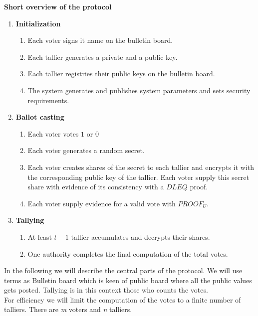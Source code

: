 \noindent
\textbf{Short overview of the protocol}

\noindent
\begin{enumerate}
    \item \textbf{Initialization}
        \begin{enumerate}
        \item Each voter signs it name on the bulletin board.
        \item Each tallier generates a private and a public key.
        \item Each tallier registries their public keys on the bulletin board.
        \item The system generates and publishes system parameters and sets security requirements.
        \end{enumerate}
    \item \textbf{Ballot casting}
    \begin{enumerate}
        \item Each voter votes $1$ or $0$
        \item Each voter generates a random secret.
        \item Each voter creates shares of the secret to each tallier and encrypts it with the corresponding public key of the tallier. Each voter supply this secret share with evidence of its consistency with a $DLEQ$ proof.
        \item Each voter supply evidence for a valid vote with $PROOF_U$.
    \end{enumerate}
    \item \textbf{Tallying}
    \begin{enumerate}
        \item At least $t-1$ tallier accumulates and decrypts their shares.
        \item One authority completes the final computation of the total votes.
    \end{enumerate}
\end{enumerate}


\noindent
In the following we will describe the central parts of the protocol. We will use terms as Bulletin board which is keen of public board where all the public values gets posted. Tallying is in this context those who counts the votes.\\


\noindent
For efficiency we will limit the computation of the votes to a finite number of talliers. There are \textit{m} voters and \textit{n} talliers. 

